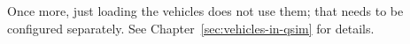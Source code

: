 Once more, just loading the vehicles does not use them; that needs to be configured separately.  
See Chapter~\ref{sec:vehicles-in-qsim} for details.










